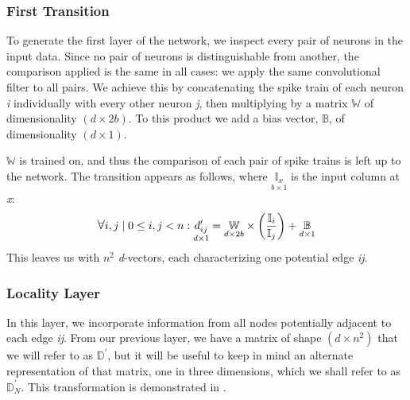 \subsubsection{First Transition}
To generate the first layer of the network, we inspect every pair of neurons in 
the input data. Since no pair of neurons is distinguishable from another, the 
comparison applied is the same in all cases: we apply the same convolutional 
filter to all pairs. We achieve this by concatenating the spike train of each 
neuron \textit{i} individually with every other neuron \textit{j}, then 
multiplying by a matrix $\mathbb{W}$ of dimensionality $(d \times 2b)$. To this 
product we add a bias vector, $\mathbb{B}$, of dimensionality $(d \times 1)$.

$\mathbb{W}$ is trained on, and thus the comparison of each pair of spike trains 
is left up to the network. The transition appears as follows, where $\underset{b 
\times 1}{\mathbb{I}_x}$ is the input column at \textit{x}:
\[
	\mathlarger\forall i,j \mid 0 \leq i,j < n: \underset{d \times 
	1}{d_{ij}^\prime} = \underset{d \times 2b}{\mathbb{W}} \times 
	\left(\frac{\mathbb{I}_i}{\mathbb{I}_j}\right) + \underset{d \times 
	1}{\mathbb{B}}
\]
This leaves us with $n^2$ \textit{d}-vectors, each characterizing one potential 
edge \textit{ij}.

\subsubsection{Locality Layer}
In this layer, we incorporate information from all nodes potentially adjacent to 
each edge \textit{ij}. From our previous layer, we have a matrix of shape $(d 
\times n^2)$ that we will refer to as $\mathbb{D}^{\prime}$, but it will be 
useful to keep in mind an alternate representation of that matrix, one in three 
dimensions, which we shall refer to as $\mathbb{D}_N^{\prime}$. This 
transformation is demonstrated in .

